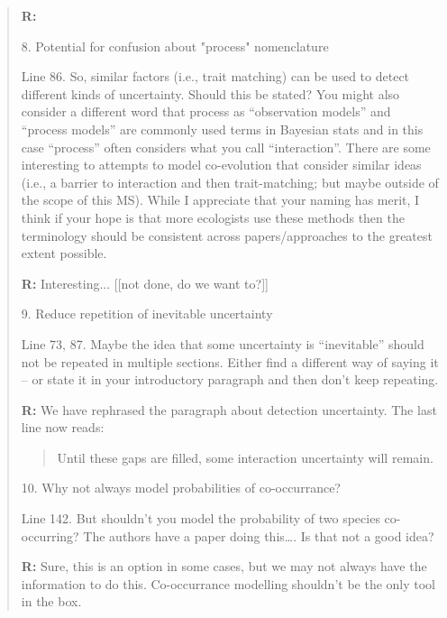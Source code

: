 \documentclass[12pt]{letter}
\newenvironment{refquote}{\bigskip \begin{it}}{\end{it}\smallskip}
\begin{document}
\begin{quotation}
		\textbf{R:}


		8. Potential for confusion about "process" nomenclature

		\begin{refquote}
		Line 86.  So, similar factors (i.e., trait matching) can be used to detect different kinds of uncertainty.  Should this be stated?  You might also consider a different word that process as “observation models” and “process models” are commonly used terms in Bayesian stats and in this case “process” often considers what you call “interaction”.  There are some interesting to attempts to model co-evolution that consider similar ideas (i.e., a barrier to interaction and then trait-matching; but maybe outside of the scope of this MS). While I appreciate that your naming has merit, I think if your hope is that more ecologists use these methods then the terminology should be consistent across papers/approaches to the greatest extent possible.
		\end{refquote}

		\textbf{R:} Interesting... [[not done, do we want to?]]

		9. Reduce repetition of inevitable uncertainty

		\begin{refquote}
		Line 73, 87.  Maybe the idea that some uncertainty is “inevitable” should not be repeated in multiple sections.  Either find a different way of saying it – or state it in your introductory paragraph and then don’t keep repeating.
		\end{refquote}

		\textbf{R:} We have rephrased the paragraph about detection uncertainty. The last line now reads:
			
			\begin{quotation}

				Until these gaps are filled, some interaction uncertainty will remain.

			\end{quotation}


		10. Why not always model probabilities of co-occurrance?

		\begin{refquote}
		Line 142.  But shouldn’t you model the probability of two species co-occurring?  The authors have a paper doing this…. Is that not a good idea?
		\end{refquote}

		\textbf{R:} Sure, this is an option in some cases, but we may not always have the information to do this. Co-occurrance modelling shouldn't be the only tool in the box.


\end{quotation}
\end{document}
